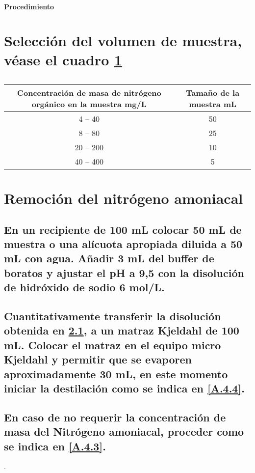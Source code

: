 \documentclass[spanish,12pt,letterpaper,titlepage]{article}
\theoremstyle{definition}
\begin{document}
	\Large{\textbf{Procedimiento}}
	\normalsize
	\section{Selección del volumen de muestra, véase el cuadro \ref{tab:A1}} \label{A.4.1}
	\begin{table}[!h]
		\centering
		\caption{}
		\label{tab:A1}
		\begin{tabular}{|c|c|}
			\hline
			\rowcolor[HTML]{C0C0C0} 
			Concentración de masa de nitrógeno orgánico en la muestra mg/L & Tamaño de la muestra mL \\ \hline
			4 -- 40                                                        & 50                      \\ \hline
			8 -- 80                                                        & 25                      \\ \hline
			20 -- 200                                                      & 10                      \\ \hline
			40 -- 400                                                      & 5                       \\ \hline
		\end{tabular}
	\end{table}
	\section{Remoción del nitrógeno amoniacal}\label{A.4.2}
	\subsection{En un recipiente de 100 mL colocar 50 mL de muestra o una alícuota apropiada diluida a 50 mL con agua. Añadir 3 mL del buffer de boratos y ajustar el pH a 9,5 con la disolución de hidróxido de sodio 6 mol/L.}\label{A.4.2.1}
	\subsection{Cuantitativamente transferir la disolución obtenida en \ref{A.4.2.1}, a un matraz Kjeldahl de 100 mL. Colocar el matraz en el equipo micro Kjeldahl y permitir que se evaporen aproximadamente 30 mL, en este momento iniciar la destilación como se indica en \ref{A.4.4}.}\label{A.4.2.2}
	\subsection{En caso de no requerir la concentración de masa del Nitrógeno amoniacal, proceder como se indica en \ref{A.4.3}.}\label{A.4.2.3}.
\end{document}
